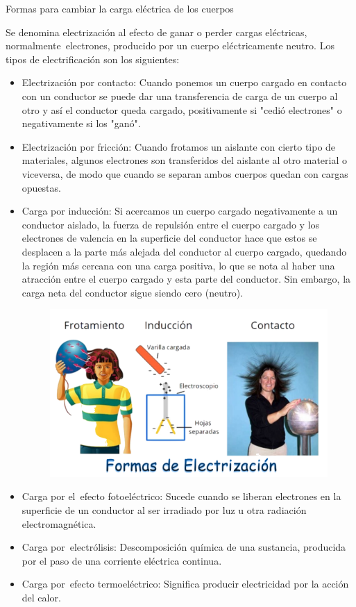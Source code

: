 \begin{myblock}
{\small{Formas para cambiar la carga eléctrica de los cuerpos}}

\small{Se denomina electrización al efecto de ganar o perder cargas eléctricas, normalmente electrones, producido por un cuerpo eléctricamente neutro. Los tipos de electrificación son los siguientes:}
\begin{itemize}
\item \small{Electrización por contacto: Cuando ponemos un cuerpo cargado en contacto con un conductor se puede dar una transferencia de carga de un cuerpo al otro y así el conductor queda cargado, positivamente si "cedió electrones" o negativamente si los "ganó".}
\item \small{Electrización por fricción: Cuando frotamos un aislante con cierto tipo de materiales, algunos electrones son transferidos del aislante al otro material o viceversa, de modo que cuando se separan ambos cuerpos quedan con cargas opuestas.}
\item \small{Carga por inducción: Si acercamos un cuerpo cargado negativamente a un conductor aislado, la fuerza de repulsión entre el cuerpo cargado y los electrones de valencia en la superficie del conductor hace que estos se desplacen a la parte más alejada del conductor al cuerpo cargado, quedando la región más cercana con una carga positiva, lo que se nota al haber una atracción entre el cuerpo cargado y esta parte del conductor. Sin embargo, la carga neta del conductor sigue siendo cero (neutro).}
\begin{figure}[H]
	\centering
	\includegraphics[width=.9\textwidth]{imagenes/imagenes22/T22IM12.png}
\end{figure}
\item \small{Carga por el efecto fotoeléctrico: Sucede cuando se liberan electrones en la superficie de un conductor al ser irradiado por luz u otra radiación electromagnética.}
\item \small{Carga por electrólisis: Descomposición química de una sustancia, producida por el paso de una corriente eléctrica continua.}
\item \small{Carga por efecto termoeléctrico: Significa producir electricidad por la acción del calor}\normalsize{.}
\end{itemize}	

\end{myblock}









